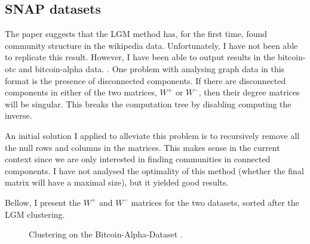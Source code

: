 \documentclass[11pt]{article}
\begin{document}



  \subsection{SNAP datasets}
  The paper suggests that the LGM method has, for the first time, found community 
  structure in the wikipedia data. Unfortunately, I have not been able to replicate
  this result. 
  However, I have been able to output results in the bitcoin-otc and bitcoin-alpha
  data. \cite{kumar2016edge}.
  One problem with analysing graph data in this format is the presence of
  disconnected components. If there are disconnected components in either of the 
  two matrices, $W^+$ or $W^-$, then their degree matrices will be singular. 
  This breaks the computation tree by disabling computing the inverse. 
  
  An initial solution I applied to alleviate this problem is to recursively remove 
  all the null rows and columns in the matrices. This makes sense in the current
  context since we are only interested in finding communities in connected 
  components. I have not analysed the optimality of this method (whether the 
  final matrix will have a maximal size), but it yielded good results. 

  Bellow, I present the $W^+$ and $W^-$ matrices for the two datasets, sorted after 
  the LGM clustering.

  \begin{figure}[h!]
    \centering
      \hfill
      \caption{\label{fig:bitcoinalphamap} Clustering on the Bitcoin-Alpha-Dataset \cite{kumar2016edge}.}
  \end{figure}
\end{document}
